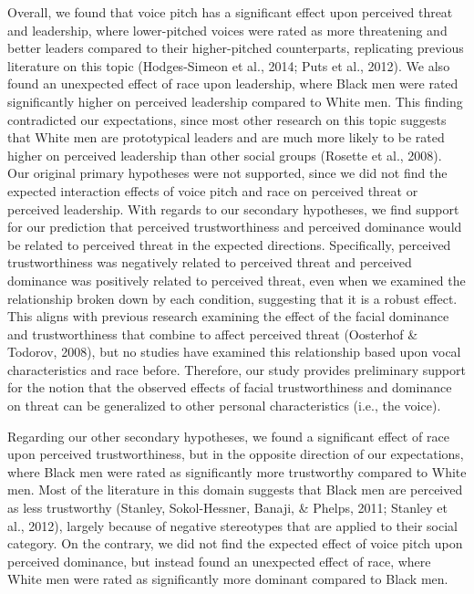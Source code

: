 \documentclass[
  english,
  man]{apa6}
\begin{document}
Overall, we found that voice pitch has a significant effect upon perceived threat and leadership, where lower-pitched voices were rated as more threatening and better leaders compared to their higher-pitched counterparts, replicating previous literature on this topic (Hodges-Simeon et al., 2014; Puts et al., 2012). We also found an unexpected effect of race upon leadership, where Black men were rated significantly higher on perceived leadership compared to White men. This finding contradicted our expectations, since most other research on this topic suggests that White men are prototypical leaders and are much more likely to be rated higher on perceived leadership than other social groups (Rosette et al., 2008). Our original primary hypotheses were not supported, since we did not find the expected interaction effects of voice pitch and race on perceived threat or perceived leadership. With regards to our secondary hypotheses, we find support for our prediction that perceived trustworthiness and perceived dominance would be related to perceived threat in the expected directions. Specifically, perceived trustworthiness was negatively related to perceived threat and perceived dominance was positively related to perceived threat, even when we examined the relationship broken down by each condition, suggesting that it is a robust effect. This aligns with previous research examining the effect of the facial dominance and trustworthiness that combine to affect perceived threat (Oosterhof \& Todorov, 2008), but no studies have examined this relationship based upon vocal characteristics and race before. Therefore, our study provides preliminary support for the notion that the observed effects of facial trustworthiness and dominance on threat can be generalized to other personal characteristics (i.e., the voice).

Regarding our other secondary hypotheses, we found a significant effect of race upon perceived trustworthiness, but in the opposite direction of our expectations, where Black men were rated as significantly more trustworthy compared to White men. Most of the literature in this domain suggests that Black men are perceived as less trustworthy (Stanley, Sokol-Hessner, Banaji, \& Phelps, 2011; Stanley et al., 2012), largely because of negative stereotypes that are applied to their social category. On the contrary, we did not find the expected effect of voice pitch upon perceived dominance, but instead found an unexpected effect of race, where White men were rated as significantly more dominant compared to Black men.
\end{document}
